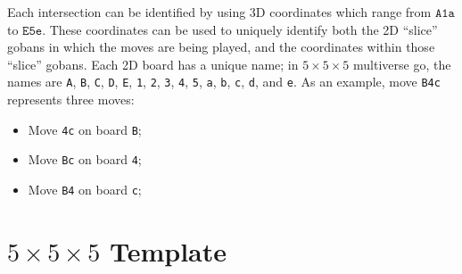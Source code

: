 \documentclass{article}
\begin{document}
Each intersection can be identified by using 3D coordinates which range from
$\texttt{A1a}$ to $\texttt{E5e}$.  These coordinates can be used to uniquely
identify both the 2D ``slice'' gobans in which the moves are being played, and
the coordinates within those ``slice'' gobans.
%
Each 2D board has a unique name;  in $5\times 5\times 5$ multiverse go, the
names are 
%
\texttt{A}, \texttt{B}, \texttt{C}, \texttt{D}, \texttt{E},
%
\texttt{1}, \texttt{2}, \texttt{3}, \texttt{4}, \texttt{5},
%
\texttt{a}, \texttt{b}, \texttt{c}, \texttt{d}, and \texttt{e}.
%
As an example, move \texttt{B4c} represents three moves:
%
\begin{itemize}
  \item Move \texttt{4c} on board \texttt{B};
  \item Move \texttt{Bc} on board \texttt{4};
  \item Move \texttt{B4} on board \texttt{c};
\end{itemize}

\section*{$5\times 5\times 5$ Template}
\end{document}
